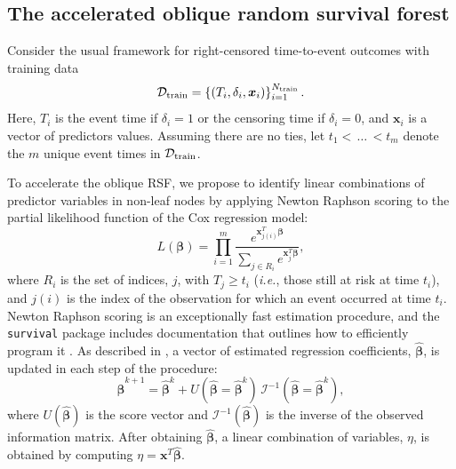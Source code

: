 \documentclass[12pt]{article}\usepackage[]{graphicx}\usepackage[]{xcolor}
\newcommand{\dataset}{{\cal D}}
\newcommand{\ie}{\textit{i.e.}}
\begin{document}

\subsection{The accelerated oblique random survival forest} \label{sec:aorsf}

Consider the usual framework for right-censored time-to-event outcomes with training data $$\dataset_{\text{train}} = \left\{ (T_i, \delta_i, \bm{x}_{i}) \right\}_{i=1}^{N_{\text{train}}}.$$ Here, $T_i$ is the event time if $\delta_i=1$ or the censoring time if $\delta_i=0$, and $\bm{x}_i$ is a vector of predictors values. Assuming there are no ties, let $t_1 < \, \ldots \, < t_m$ denote the $m$ unique event times in $\dataset_{\text{train}}$.

To accelerate the oblique RSF, we propose to identify linear combinations of predictor variables in non-leaf nodes by applying Newton Raphson scoring to the partial likelihood function of the Cox regression model:
\begin{equation}\label{eqn:cox-partial-likelihood}
L(\bm\beta) = \prod_{i=1}^m \frac{e^{\bm{x}_{j(i)}^T \bm\beta}}{\sum_{j \in R_i} e^{\bm{x}_j^T \bm\beta}},
\end{equation}
where $R_i$ is the set of indices, $j$, with $T_j \geq t_i$ (\ie, those still at risk at time $t_i$), and $j(i)$ is the index of the observation for which an event occurred at time $t_i$. Newton Raphson scoring is an exceptionally fast estimation procedure, and the \texttt{survival} package \citep{survival} includes documentation that outlines how to efficiently program it \citep{therneau_survival_2022}. As described in \cite{therneau2000cox}, a vector of estimated regression coefficients, $\hat{\bm{\beta}}$, is updated in each step of the procedure: $$\hat{\bm{\beta}}^{k+1} =  \hat{\bm{\beta}}^{k} + U(\hat{\bm{\beta}} = \hat{\bm{\beta}}^{k})\, \mathcal{I}^{-1}(\hat{\bm{\beta}} = \hat{\bm{\beta}}^{k}),$$ where $U(\hat{\bm{\beta}})$ is the score vector and $\mathcal{I}^{-1}(\hat{\bm{\beta}})$ is the inverse of the observed information matrix. After obtaining $\hat{\bm\beta}$, a linear combination of variables, $\eta$, is obtained by computing $\eta = \bm{x}^T \hat{\bm{\beta}}$.
\end{document}
